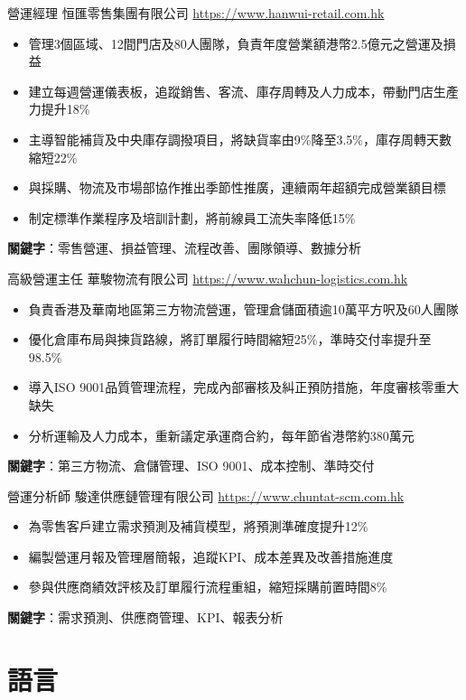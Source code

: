 \documentclass[a4paper, serif, 10pt]{moderncv}
\begin{document}
        {營運經理}
        {恒匯零售集團有限公司}
        {\url{https://www.hanwui-retail.com.hk}}
        {}
        {\begin{itemize}
\item 管理3個區域、12間門店及80人團隊，負責年度營業額港幣2.5億元之營運及損益
\item 建立每週營運儀表板，追蹤銷售、客流、庫存周轉及人力成本，帶動門店生產力提升18\%
\item 主導智能補貨及中央庫存調撥項目，將缺貨率由9\%降至3.5\%，庫存周轉天數縮短22\%
\item 與採購、物流及市場部協作推出季節性推廣，連續兩年超額完成營業額目標
\item 制定標準作業程序及培訓計劃，將前線員工流失率降低15\%
\end{itemize}
\textbf{關鍵字}：零售營運、損益管理、流程改善、團隊領導、數據分析}

        {高級營運主任}
        {華駿物流有限公司}
        {\url{https://www.wahchun-logistics.com.hk}}
        {}
        {\begin{itemize}
\item 負責香港及華南地區第三方物流營運，管理倉儲面積逾10萬平方呎及60人團隊
\item 優化倉庫布局與揀貨路線，將訂單履行時間縮短25\%，準時交付率提升至98.5\%
\item 導入ISO 9001品質管理流程，完成內部審核及糾正預防措施，年度審核零重大缺失
\item 分析運輸及人力成本，重新議定承運商合約，每年節省港幣約380萬元
\end{itemize}
\textbf{關鍵字}：第三方物流、倉儲管理、ISO 9001、成本控制、準時交付}

        {營運分析師}
        {駿達供應鏈管理有限公司}
        {\url{https://www.chuntat-scm.com.hk}}
        {}
        {\begin{itemize}
\item 為零售客戶建立需求預測及補貨模型，將預測準確度提升12\%
\item 編製營運月報及管理層簡報，追蹤KPI、成本差異及改善措施進度
\item 參與供應商績效評核及訂單履行流程重組，縮短採購前置時間8\%
\end{itemize}
\textbf{關鍵字}：需求預測、供應商管理、KPI、報表分析}
\section{語言}
\end{document}
